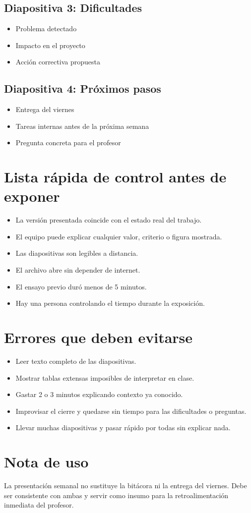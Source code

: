 \documentclass[11pt]{article}
\begin{document}
\subsection*{Diapositiva 3: Dificultades}
\begin{itemize}
\item Problema detectado
\item Impacto en el proyecto
\item Acci\'on correctiva propuesta
\end{itemize}

\subsection*{Diapositiva 4: Pr\'oximos pasos}
\begin{itemize}
\item Entrega del viernes
\item Tareas internas antes de la pr\'oxima semana
\item Pregunta concreta para el profesor
\end{itemize}

\section{Lista r\'apida de control antes de exponer}
\begin{itemize}
\item La versi\'on presentada coincide con el estado real del trabajo.
\item El equipo puede explicar cualquier valor, criterio o figura mostrada.
\item Las diapositivas son legibles a distancia.
\item El archivo abre sin depender de internet.
\item El ensayo previo dur\'o menos de 5 minutos.
\item Hay una persona controlando el tiempo durante la exposici\'on.
\end{itemize}

\section{Errores que deben evitarse}
\begin{itemize}
\item Leer texto completo de las diapositivas.
\item Mostrar tablas extensas imposibles de interpretar en clase.
\item Gastar 2 o 3 minutos explicando contexto ya conocido.
\item Improvisar el cierre y quedarse sin tiempo para las dificultades o preguntas.
\item Llevar muchas diapositivas y pasar r\'apido por todas sin explicar nada.
\end{itemize}

\section{Nota de uso}
\begin{infobox}
La presentaci\'on semanal no sustituye la bit\'acora ni la entrega del viernes. Debe ser consistente con ambas y servir como insumo para la retroalimentaci\'on inmediata del profesor.
\end{infobox}
\end{document}

